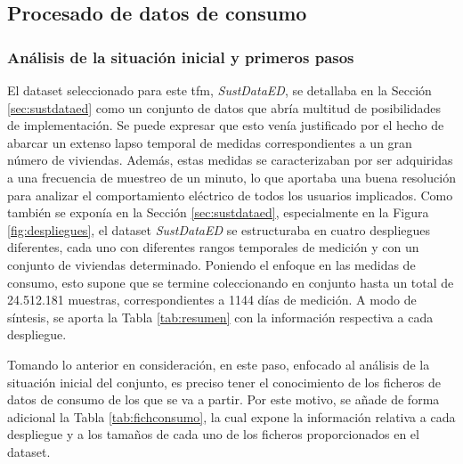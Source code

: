 \subsection{Procesado de datos de consumo}

\subsubsection{Análisis de la situación inicial y primeros pasos}
\label{sec:inicialproc}

El dataset seleccionado para este \gls{tfm}, \textit{SustDataED}, se detallaba en la Sección \ref{sec:sustdataed} como un conjunto de datos que abría multitud de posibilidades de implementación. Se puede expresar que esto venía justificado por el hecho de abarcar un extenso lapso temporal de medidas correspondientes a un gran número de viviendas. Además, estas medidas se caracterizaban por ser adquiridas a una frecuencia de muestreo de un minuto, lo que aportaba una buena resolución para analizar el comportamiento eléctrico de todos los usuarios implicados. Como también se exponía en la Sección \ref{sec:sustdataed}, especialmente en la Figura \ref{fig:despliegues}, el dataset \textit{SustDataED} se estructuraba en cuatro despliegues diferentes, cada uno con diferentes rangos temporales de medición y con un conjunto de viviendas determinado. Poniendo el enfoque en las medidas de consumo, esto supone que se termine coleccionando en conjunto hasta un total de 24.512.181 muestras, correspondientes a 1144 días de medición. A modo de síntesis, se aporta la Tabla \ref{tab:resumen} con la información respectiva a cada despliegue. \cite{sustdata}

\vspace{3mm}

Tomando lo anterior en consideración, en este paso, enfocado al análisis de la situación inicial del conjunto, es preciso tener el conocimiento de los ficheros de datos de consumo de los que se va a partir. Por este motivo, se añade de forma adicional la Tabla \ref{tab:fichconsumo}, la cual expone la información relativa a cada despliegue y a los tamaños de cada uno de los ficheros proporcionados en el dataset.

\vspace{3mm}

